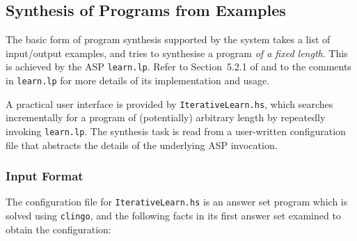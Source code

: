 \documentclass[a4paper,twoside,notitlepage,12pt]{article}
\begin{document}
\subsection{Synthesis of Programs from Examples} \label{sec:psynx}

The basic form of program synthesis supported by the system takes a list of 
input/output examples, and tries to synthesise a program \emph{of a fixed length}.
This is achieved by the ASP \verb|learn.lp|. Refer to Section~5.2.1 of 
\cite{final} and to the comments in \verb|learn.lp| for more details of its 
implementation and usage.

A practical user interface is provided by \verb|IterativeLearn.hs|, which 
searches incrementally for a program of (potentially) arbitrary length by 
repeatedly invoking \verb|learn.lp|. The synthesis task is read from a 
user-written configuration file that abstracts the details of the underlying 
ASP invocation.

\subsubsection{Input Format}

The configuration file for \verb|IterativeLearn.hs| is an answer set program 
which is solved using \verb|clingo|, and the following facts in its first 
answer set examined to obtain the configuration:
\end{document}
